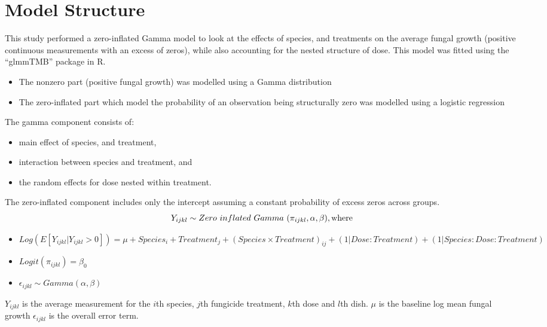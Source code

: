\documentclass[
  10pt,
  letterpaper,
  twocolumn]{article}
\begin{document}
\section*{Model Structure}
\vspace{-0.2cm}
This study performed a zero-inflated Gamma model to look at the effects of species, and treatments on the average fungal growth (positive continuous measurements with an excess of zeros), while also accounting for the nested structure of dose. This model was fitted using the ``glmmTMB'' package in R.
\vspace{-0.2cm}
\begin{itemize}
\setlength{\itemsep}{0pt}
\setlength{\parskip}{0pt}
\item The nonzero part (positive fungal growth) was modelled using a Gamma distribution 
\item The zero-inflated part which model the probability of an observation being structurally zero was modelled using a logistic regression
\end{itemize}
\vspace{-0.3cm}
The gamma component consists of:
\vspace{-0.3cm}
\begin{itemize}
\setlength{\itemsep}{0pt}
\setlength{\parskip}{0pt}
\item main effect of species, and treatment, 
\item interaction between species and treatment, and 
\item the random effects for dose nested within treatment.
\end{itemize}
\vspace{-0.3cm}
The zero-inflated component includes only the intercept assuming a constant probability of excess zeros across groups.
\vspace{-0.3cm}
\begin{equation}
\vspace{-0.3cm}
Y_{ijkl} \sim Zero\ inflated\ Gamma\ (\pi_{ijkl}, \alpha, \beta), \text{where}
\end{equation}
\vspace{-0.3cm}
\begin{itemize}
\setlength{\itemsep}{0pt}
\setlength{\parskip}{0pt}
\vspace{-0.3cm}
\item $Log(E[Y_{ijkl}|Y_{ijkl} > 0]) = \mu + Species_i + Treatment_j + (Species \times Treatment)_{ij} + (1|Dose:Treatment) + (1|Species:Dose:Treatment)$
\item $Logit(\pi_{ijkl}) = \beta_0$
\item $\epsilon_{ijkl} \sim Gamma(\alpha, \beta)$
\end{itemize}
\vspace{-0.3cm}
$Y_{ijkl}$ is the average measurement for the $i$th species, $j$th fungicide treatment, $k$th dose and $l$th dish.
$\mu$ is the baseline log mean fungal growth
$\epsilon_{ijkl}$ is the overall error term.
\end{document}

